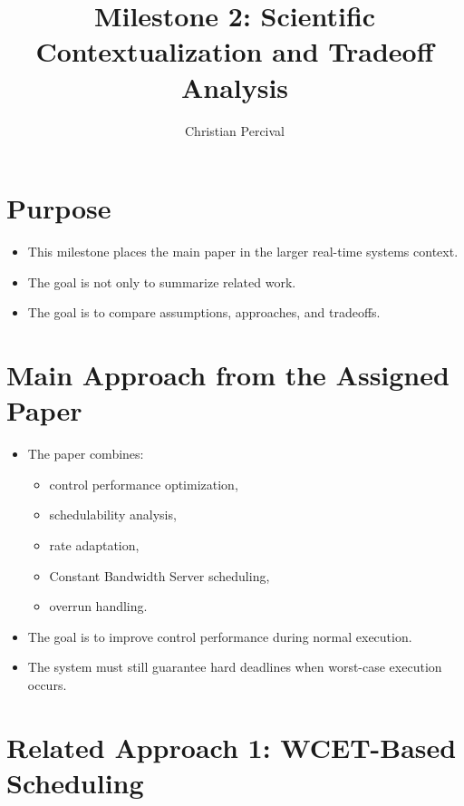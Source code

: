 \documentclass[a4paper,11pt]{article}
\title{Milestone 2: Scientific Contextualization and Tradeoff Analysis}
\author{Christian Percival}
\date{}
\begin{document}
\maketitle

\section*{Purpose}

\begin{itemize}
    \item This milestone places the main paper in the larger real-time systems context.
    \item The goal is not only to summarize related work.
    \item The goal is to compare assumptions, approaches, and tradeoffs.
\end{itemize}

\section*{Main Approach from the Assigned Paper}

\begin{itemize}
    \item The paper combines:
    \begin{itemize}
        \item control performance optimization,
        \item schedulability analysis,
        \item rate adaptation,
        \item Constant Bandwidth Server scheduling,
        \item overrun handling.
    \end{itemize}
    \item The goal is to improve control performance during normal execution.
    \item The system must still guarantee hard deadlines when worst-case execution occurs.
\end{itemize}

\section*{Related Approach 1: WCET-Based Scheduling}
\end{document}

